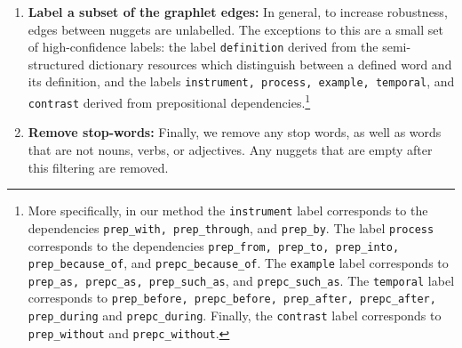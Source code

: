 \begin{enumerate}
\item {\textbf{Label a subset of the graphlet  edges:} In general, to increase robustness, edges between nuggets are unlabelled.  The exceptions to this are a small set of high-confidence labels: the label {\tt definition} derived from the semi-structured dictionary resources which distinguish between a defined word and its definition, and the labels {\tt instrument, process, example, temporal}, and {\tt contrast} derived from prepositional dependencies.\footnote{More specifically, in our method the {\tt instrument} label corresponds to the dependencies {\tt prep\_with, prep\_through}, and {\tt prep\_by}.  The label {\tt process} corresponds to the dependencies {\tt prep\_from, prep\_to, prep\_into, prep\_because\_of}, and {\tt prepc\_because\_of}.  The {\tt example} label corresponds to {\tt prep\_as, prepc\_as, prep\_such\_as}, and {\tt prepc\_such\_as}.  The {\tt temporal} label corresponds to {\tt prep\_before, prepc\_before, prep\_after, prepc\_after, prep\_during} and {\tt prepc\_during}.  Finally, the {\tt contrast} label corresponds to {\tt prep\_without} and {\tt prepc\_without}.}}

\item {\textbf{Remove stop-words:}  Finally, we remove any stop words, as well as words that are not nouns, verbs, or adjectives.  Any nuggets that are empty after this filtering are removed. }

\end{enumerate}


